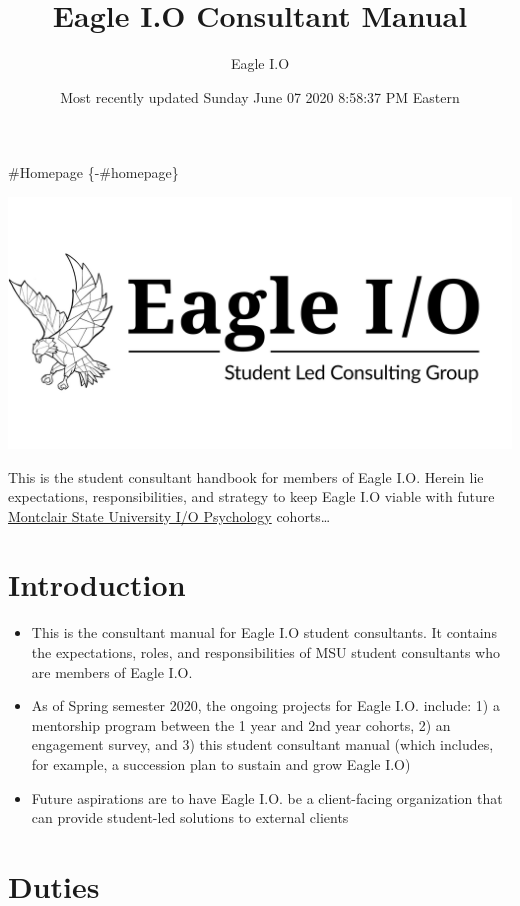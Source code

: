 \documentclass[
]{book}
\title{Eagle I.O Consultant Manual}
\author{Eagle I.O}
\date{Most recently updated Sunday June 07 2020 8:58:37 PM Eastern}
\providecommand{\tightlist}{%
  \setlength{\itemsep}{0pt}\setlength{\parskip}{0pt}}
\begin{document}
\maketitle

{
\setcounter{tocdepth}{1}
\tableofcontents
}
\#Homepage \{-\#homepage\}

\includegraphics{images/eagleio.PNG}

This is the student consultant handbook for members of Eagle I.O. Herein lie expectations, responsibilities, and strategy to keep Eagle I.O viable with future \href{https://www.montclair.edu/psychology/graduate-programs/industrial-organizational-psychology/}{Montclair State University I/O Psychology} cohorts\ldots{}

\hypertarget{introduction}{%
\chapter{Introduction}\label{introduction}}

\begin{itemize}
\tightlist
\item
  This is the consultant manual for Eagle I.O student consultants. It contains the expectations, roles, and responsibilities of MSU student consultants who are members of Eagle I.O.
\item
  As of Spring semester 2020, the ongoing projects for Eagle I.O. include: 1) a mentorship program between the 1 year and 2nd year cohorts, 2) an engagement survey, and 3) this student consultant manual (which includes, for example, a succession plan to sustain and grow Eagle I.O)
\item
  Future aspirations are to have Eagle I.O. be a client-facing organization that can provide student-led solutions to external clients
\end{itemize}

\hypertarget{intro}{%
\chapter{Duties}\label{intro}}
\end{document}
